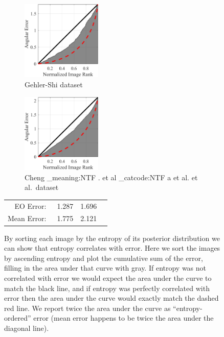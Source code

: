 \documentclass[10pt,twocolumn,letterpaper]{article}
\makeatletter
\newcommand\latinabbrev[1]{
  \peek_meaning:NTF . {%
    #1\@}%
  { \peek_catcode:NTF a {%
      #1.\@ }%
    {#1.\@}}}
\def\etal{\latinabbrev{et al}}
\makeatother
\begin{document}
\begin{figure}[!]
\centering
  \begin{subfigure}[!]{1.55in}
    \includegraphics[width=1.5in]{figures/confidence_err_gehler.png}
    \caption{Gehler-Shi dataset \cite{Gehler08,shifunt}}
  \end{subfigure}
  \hspace{0.05in}
  \begin{subfigure}[!]{1.55in}
    \includegraphics[width=1.5in]{figures/confidence_err_cheng.png}
    \caption{Cheng \etal\, dataset \cite{Cheng14}}
  \end{subfigure}
  \small
  \begin{tabular}{ r@{}c r r}
  EO Error: \quad\, & 1.287 & \hspace{1.0in} 1.696 & \hspace{0.5in}\\
  Mean Error: \quad\, & 1.775 & \hspace{1.0in} 2.121  & \hspace{0.5in}
  \end{tabular}
  \caption{
    By sorting each image by the entropy of its posterior distribution we
    can show that entropy correlates with error.
    Here we sort the images by ascending entropy and plot the cumulative sum of the error,
    filling in the area under that curve with gray.
    If entropy was not correlated with error we would expect the area under the
    curve to match the black line, and if entropy was perfectly correlated with
    error then the area under the curve would exactly match the dashed red line.
    We report twice the area under the curve as ``entropy-ordered'' error
    (mean error happens to be twice the area under the diagonal line).
    \label{fig:confidence_err}
  }
\end{figure}
\end{document}

